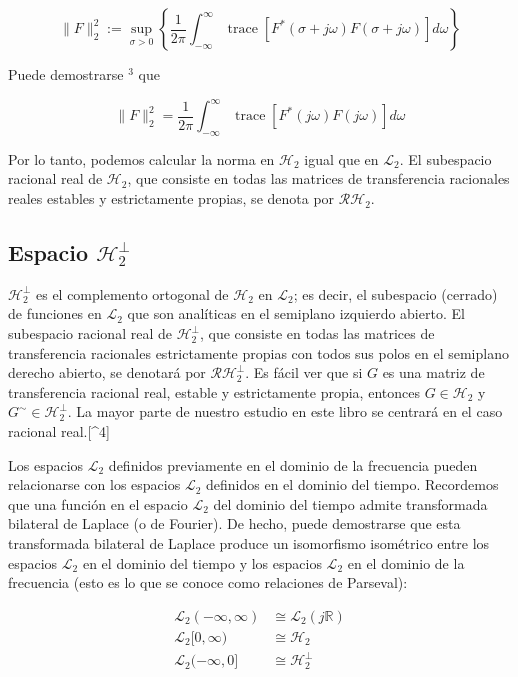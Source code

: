 $$
\|F\|_{2}^{2}:=\sup _{\sigma>0}\left\{\frac{1}{2 \pi} \int_{-\infty}^{\infty} \operatorname{trace}\left[F^{*}(\sigma+j \omega) F(\sigma+j \omega)\right] d \omega\right\}
$$

Puede demostrarse ${ }^{3}$ que

$$
\|F\|_{2}^{2}=\frac{1}{2 \pi} \int_{-\infty}^{\infty} \operatorname{trace}\left[F^{*}(j \omega) F(j \omega)\right] d \omega
$$

Por lo tanto, podemos calcular la norma en $\mathcal{H}_{2}$ igual que en $\mathcal{L}_{2}$. El subespacio racional real de $\mathcal{H}_{2}$, que consiste en todas las matrices de transferencia racionales reales estables y estrictamente propias, se denota por $\mathcal{R H}_{2}$.

\subsection*{Espacio $\mathcal{H}_{2}^{\perp}$}
$\mathcal{H}_{2}^{\perp}$ es el complemento ortogonal de $\mathcal{H}_{2}$ en $\mathcal{L}_{2}$; es decir, el subespacio (cerrado) de funciones en $\mathcal{L}_{2}$ que son analíticas en el semiplano izquierdo abierto. El subespacio racional real de $\mathcal{H}_{2}^{\perp}$, que consiste en todas las matrices de transferencia racionales estrictamente propias con todos sus polos en el semiplano derecho abierto, se denotará por $\mathcal{R} \mathcal{H}_{2}^{\perp}$. Es fácil ver que si $G$ es una matriz de transferencia racional real, estable y estrictamente propia, entonces $G \in \mathcal{H}_{2}$ y $G^{\sim} \in \mathcal{H}_{2}^{\perp}$. La mayor parte de nuestro estudio en este libro se centrará en el caso racional real.[\^{}4]

Los espacios $\mathcal{L}_{2}$ definidos previamente en el dominio de la frecuencia pueden relacionarse con los espacios $\mathcal{L}_{2}$ definidos en el dominio del tiempo. Recordemos que una función en el espacio $\mathcal{L}_{2}$ del dominio del tiempo admite transformada bilateral de Laplace (o de Fourier). De hecho, puede demostrarse que esta transformada bilateral de Laplace produce un isomorfismo isométrico entre los espacios $\mathcal{L}_{2}$ en el dominio del tiempo y los espacios $\mathcal{L}_{2}$ en el dominio de la frecuencia (esto es lo que se conoce como relaciones de Parseval):

$$
\begin{aligned}
\mathcal{L}_{2}(-\infty, \infty) & \cong \mathcal{L}_{2}(j \mathbb{R}) \\
\mathcal{L}_{2}[0, \infty) & \cong \mathcal{H}_{2} \\
\mathcal{L}_{2}(-\infty, 0] & \cong \mathcal{H}_{2}^{\perp}
\end{aligned}
$$

